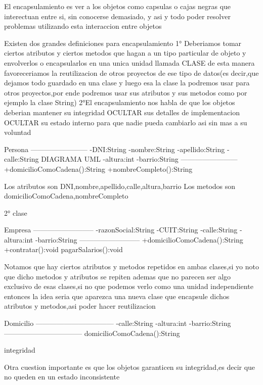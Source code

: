 El encapsulamiento es ver a los objetos como capsulas o cajas negras que interectuan entre si, sin conocerse demasiado, y asi y todo poder resolver problemas utilizando esta interaccion entre
objetos

Existen dos grandes definiciones para encapsulamiento
1° Deberiamos tomar ciertos atributos y ciertos metodos que hagan a un tipo particular de objeto y envolverlos o encapsularlos en una unica unidad llamada CLASE de esta manera favoreceriamos  la reutilizacion
de otros proyectos de ese tipo de datos(es decir,que dejamos todo guardado en una clase y luego esa la clase la podremos usar para otros proyectos,por ende podremos usar sus atributos y sus metodos como por ejemplo la clase String)
2°El encapsulamiento nos habla de que los objetos deberian mantener su integridad OCULTAR sus detalles de implementacion OCULTAR su estado interno para que nadie pueda cambiarlo asi sin mas a su voluntad


            Persona
    ------------------------
    -DNI:String
    -nombre:String
    -apellido:String
    -calle:String                       DIAGRAMA UML
    -altura:int
    -barrio:String
    ------------------------
    +domicilioComoCadena():String
    +nombreCompleto():String

    Los atributos son DNI,nombre,apellido,calle,altura,barrio
    Los metodos son domicilioComoCadena,nombreCompleto

    2° clase

            Empresa
    --------------------------
    -razonSocial:String
    -CUIT:String
    -calle:String
    -altura:int
    -barrio:String
    --------------------------
    +domicilioComoCadena():String
    +contratar():void
    pagarSalarios():void

    Notamos que hay ciertos atributos y metodos repetidos en ambas clases,si yo noto que dicho metodos y atributos se repiten ademas que no parecen ser algo exclusivo de esas clases,si no que podemos verlo como una unidad independiente
    entonces la idea seria que aparezca una nueva clase que encapsule dichos atributos y metodos,asi poder hacer reutilizacion

        Domicilio
---------------------------------
    -calle:String
    -altura:int
    -barrio:String
---------------------------------
domicilioComoCadena():String


integridad

Otra cuestion importante es que los objetos garanticen su integridad,es decir que no queden en un estado inconsistente

